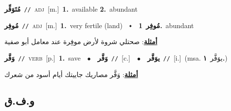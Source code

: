 \documentclass[10pt,a4paper,twoside]{article} %
\begin{document}
\begin{multicols}{2}
{\setlength\topsep{0pt}\textbf{\foreignlanguage{arabic}{مُتَوَفِّر}}\ {\color{gray}\texttt{//}\color{black}}\ \textsc{adj}\ [m.]\ \textbf{1.}~available  \textbf{2.}~abundant\ } \vspace{2mm}

{\setlength\topsep{0pt}\textbf{\foreignlanguage{arabic}{مُوفِر}}\ {\color{gray}\texttt{//}\color{black}}\ \textsc{adj}\ [m.]\ \textbf{1.}~very fertile (land)\ \ $\smblkdiamond$\ \ \setlength\topsep{0pt}\textbf{\foreignlanguage{arabic}{مُوفِر}}\ \textbf{1.}~abundant\  \begin{flushright}\color{gray}\foreignlanguage{arabic}{\textbf{\underline{\foreignlanguage{arabic}{أمثلة}}}: صحتلي شروة لأرض موفِرة عند معامل أبو صفية}\end{flushright}\color{black}} \vspace{2mm}

{\setlength\topsep{0pt}\textbf{\foreignlanguage{arabic}{وَفَّر}}\ {\color{gray}\texttt{//}\color{black}}\ \textsc{verb}\ [p.]\ \textbf{1.}~save\ \ $\bullet$\ \ \setlength\topsep{0pt}\textbf{\foreignlanguage{arabic}{وَفَّر}}\ {\color{gray}\texttt{//}\color{black}}\ [c.]\ \ $\bullet$\ \ \setlength\topsep{0pt}\textbf{\foreignlanguage{arabic}{يوَفَّر}}\ {\color{gray}\texttt{//}\color{black}}\ [i.]\ \color{gray}(msa. \foreignlanguage{arabic}{يوَفَّر}~\foreignlanguage{arabic}{\textbf{١.}})\color{black}\  \begin{flushright}\color{gray}\foreignlanguage{arabic}{\textbf{\underline{\foreignlanguage{arabic}{أمثلة}}}: وَفَّر مصاريك جاييتك أيام أسود من شعرك}\end{flushright}\color{black}} \vspace{2mm}

\vspace{-3mm}
\subsection*{\color{blue}\foreignlanguage{arabic}{و.ف.ق}\color{blue}{}} 


\end{multicols}
\end{document}
